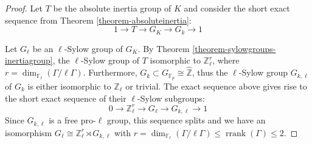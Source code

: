 \begin{proof}
Let $T$ be the absolute inertia group of $K$ and consider the short exact sequence from Theorem \ref{theorem-absoluteinertia}:
\[ 1\longrightarrow T\longrightarrow G_K\longrightarrow G_k\longrightarrow 1 \]

Let $G_\ell$ be an $\ell$-Sylow group of $G_K$. By Theorem \ref{theorem-sylowgroups-inertiagroup}, the $\ell$-Sylow group of $T$ isomorphic to $\mathbb{Z}_\ell^r$, where $r =\dim_{\mathbb{F}_\ell}(\Gamma/\ell\Gamma)$. Furthermore, $G_k\subset G_{\mathbb{F}_p}\cong\hat{\mathbb{Z}}$, thus the $\ell$-Sylow group $G_{k,\ell}$ of $G_k$ is either isomorphic to $\mathbb{Z}_\ell$ or trivial. The exact sequence above gives rise to the short exact sequence of their $\ell$-Sylow subgroups:
\[ 0\longrightarrow\mathbb{Z}_\ell^r \longrightarrow G_\ell \longrightarrow G_{k,\ell}\longrightarrow 1 \]
Since $G_{k,\ell}$ is a free pro-$\ell$ group, this sequence splits and we have an isomorphism $G_\ell \cong \mathbb{Z}_\ell^r\rtimes G_{k,\ell}$ with $r =\dim_{\mathbb{F}_\ell}(\Gamma/\ell\Gamma)\leq \operatorname{rrank}(\Gamma)\leq 2$.


\end{proof}
